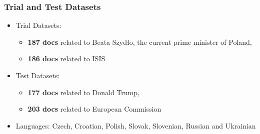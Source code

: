 \documentclass{beamer}
\begin{document}
\begin{frame}[fragile]
 \frametitle{Trial and Test Datasets}

\begin{itemize}

\item Trial Datasets: 

\begin{itemize}

\item \textbf{187 docs} related to {\color{red}Beata Szydło}, the
current prime minister of Poland, 

\item \textbf{186 docs} related to {\color{red}ISIS}

\end{itemize}

\vspace{0.2cm}

\item Test Datasets:

\begin{itemize}

\item \textbf{177 docs} related to {\color{red}Donald Trump}, 

\item \textbf{203 docs} related to {\color{red}European Commission}

\end{itemize}

\vspace{0.2cm}

\item Languages: Czech, Croatian, Polish, Slovak, Slovenian, Russian and Ukrainian

\end{itemize}

\end{frame}
\end{document}
